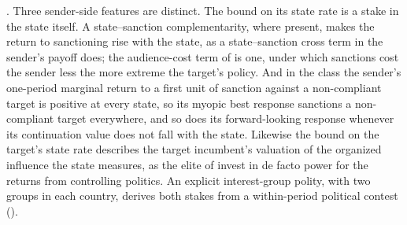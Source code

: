 \citep[p.~403]{DorussenMo2001}.
Three sender-side features are distinct. The bound on its state rate is a
stake in the state itself. A state--sanction complementarity, where present,
makes the return to sanctioning rise with the state, as a state--sanction cross
term in the sender's payoff does; the audience-cost term of \citet{DorussenMo2001} is
one, under which sanctions cost the sender less the more extreme the target's
policy. And in the class the sender's one-period marginal
return to a first unit of sanction against a non-compliant target is positive at every
state, so its myopic best response sanctions a non-compliant target everywhere, and so
does its forward-looking response whenever its continuation value does not fall
with the state. Likewise the bound on the target's state rate describes the
target incumbent's valuation of the organized
influence the state measures, as the elite of \citet[p.~268]{AcemogluRobinson2008}
invest in de facto power for the returns from controlling politics. An explicit interest-group polity, with two groups
in each country, derives both stakes from a within-period political contest
().

